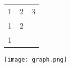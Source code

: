 \documentclass{article}
\begin{document}
\begin{tabular}{ c c c }
1 & 2 & 3 \\
1 & 2 & \\
1 & & \\
\end{tabular}
\texttt{[image: graph.png]}
\end{document}
